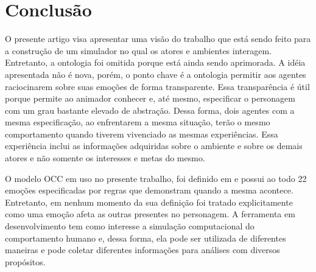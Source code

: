 \chapter{Conclusão} \label{ch:cf}


O presente artigo visa apresentar uma visão do trabalho que está sendo feito
para a construção de um simulador no qual os atores e ambientes interagem.
Entretanto, a ontologia foi omitida porque está ainda sendo aprimorada.  A
idéia apresentada não é nova, porém, o ponto chave é a ontologia permitir aos
agentes raciocinarem sobre suas emoções de forma transparente.  Essa
transparência é útil porque permite ao animador conhecer e, até mesmo,
especificar o personagem com um grau bastante elevado de abstração.
%
Dessa forma, dois agentes com a mesma especificação, ao enfrentarem a mesma
situação, terão o mesmo comportamento quando tiverem vivenciado as mesmas
experiências. Essa experiência inclui as informações adquiridas sobre o
ambiente e sobre os demais atores e não somente os interesses e metas do
mesmo.

O modelo OCC em uso no presente trabalho, foi definido em
\citeyear{ortony1988cse} e possui ao todo 22 emoções especificadas por regras
que demonstram quando a mesma acontece. Entretanto, em nenhum momento da sua
definição foi tratado explicitamente como uma emoção afeta as outras presentes
no personagem.
%
A ferramenta em desenvolvimento tem como interesse a simulação computacional
do comportamento humano e, dessa forma, ela pode ser utilizada de diferentes
maneiras e pode coletar diferentes informações para análises com diversos
propósitos.
